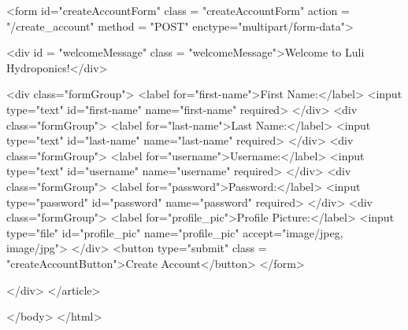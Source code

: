 \documentclass[12pt]{article} %
\begin{document}
\begin{htmlcode}[caption={Create Account HTML}]
            <form id="createAccountForm" class = "createAccountForm" action = "/create_account"  method = "POST" enctype="multipart/form-data">
    
                <div id = "welcomeMessage" class = "welcomeMessage">Welcome to Luli Hydroponics!</div>
    
                <div class="formGroup">  
                   <label for="first-name">First Name:</label>
                   <input type="text" id="first-name" name="first-name" required>
                </div>
                <div class="formGroup">
                   <label for="last-name">Last Name:</label>
                   <input type="text" id="last-name" name="last-name" required>
                </div>
                <div class="formGroup">
                   <label for="username">Username:</label>
                   <input type="text" id="username" name="username" required>
                </div>
                <div class="formGroup">
                   <label for="password">Password:</label>
                   <input type="password" id="password" name="password" required>
                </div>
                <div class="formGroup">  
                   <label for="profile_pic">Profile Picture:</label>
                   <input type="file" id="profile_pic" name="profile_pic" accept="image/jpeg, image/jpg">
                </div>
                <button type="submit" class = "createAccountButton">Create Account</button>
            </form>       
    
          </div>
    </article> 
       
    </body>
    </html>
    \end{htmlcode}
    
    \pagebreak
    
\end{document}
